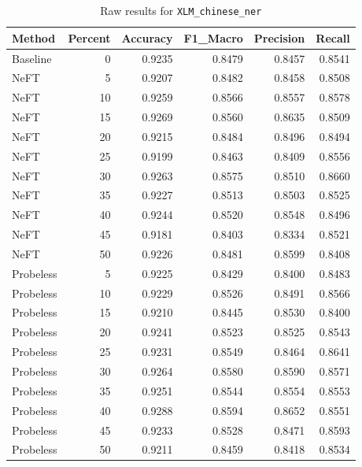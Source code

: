 \documentclass[12pt]{article}
\begin{document}
\begin{table}[H]
\centering
\caption{Raw results for \texttt{XLM\_chinese\_ner}}
\label{tab:xlm-chinese-ner}
\begin{tabular}{lrrrrr}
\toprule
Method & Percent & Accuracy & F1\_Macro & Precision & Recall \\
\midrule
Baseline & 0 & 0.9235 & 0.8479 & 0.8457 & 0.8541 \\
NeFT & 5 & 0.9207 & 0.8482 & 0.8458 & 0.8508 \\
NeFT & 10 & 0.9259 & 0.8566 & 0.8557 & 0.8578 \\
NeFT & 15 & 0.9269 & 0.8560 & 0.8635 & 0.8509 \\
NeFT & 20 & 0.9215 & 0.8484 & 0.8496 & 0.8494 \\
NeFT & 25 & 0.9199 & 0.8463 & 0.8409 & 0.8556 \\
NeFT & 30 & 0.9263 & 0.8575 & 0.8510 & 0.8660 \\
NeFT & 35 & 0.9227 & 0.8513 & 0.8503 & 0.8525 \\
NeFT & 40 & 0.9244 & 0.8520 & 0.8548 & 0.8496 \\
NeFT & 45 & 0.9181 & 0.8403 & 0.8334 & 0.8521 \\
NeFT & 50 & 0.9226 & 0.8481 & 0.8599 & 0.8408 \\
Probeless & 5 & 0.9225 & 0.8429 & 0.8400 & 0.8483 \\
Probeless & 10 & 0.9229 & 0.8526 & 0.8491 & 0.8566 \\
Probeless & 15 & 0.9210 & 0.8445 & 0.8530 & 0.8400 \\
Probeless & 20 & 0.9241 & 0.8523 & 0.8525 & 0.8543 \\
Probeless & 25 & 0.9231 & 0.8549 & 0.8464 & 0.8641 \\
Probeless & 30 & 0.9264 & 0.8580 & 0.8590 & 0.8571 \\
Probeless & 35 & 0.9251 & 0.8544 & 0.8554 & 0.8553 \\
Probeless & 40 & 0.9288 & 0.8594 & 0.8652 & 0.8551 \\
Probeless & 45 & 0.9233 & 0.8528 & 0.8471 & 0.8593 \\
Probeless & 50 & 0.9211 & 0.8459 & 0.8418 & 0.8534 \\
\bottomrule
\end{tabular}
\end{table}
\end{document}
